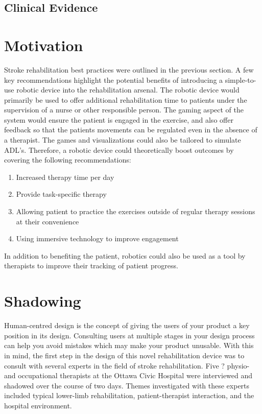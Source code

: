 \documentclass[12pt]{report}
\begin{document}
	\subsection{Clinical Evidence}
%
%

	\section{Motivation} 
Stroke rehabilitation best practices were outlined in the previous section. A few key recommendations highlight the potential benefits of introducing a simple-to-use robotic device into the rehabilitation arsenal. The robotic device would primarily be used to offer additional rehabilitation time to patients under the supervision of a nurse or other responsible person. The gaming aspect of the system would ensure the patient is engaged in the exercise, and also offer feedback so that the patients movements can be regulated even in the absence of a therapist. The games and visualizations could also be tailored to simulate ADL's. Therefore, a robotic device could theoretically boost outcomes by covering the following recommendations:
\begin{enumerate}
	\item Increased therapy time per day 
	\item Provide task-specific therapy
	\item Allowing patient to practice the exercises outside of regular therapy sessions at their convenience 
	\item Using immersive technology to improve engagement 
\end{enumerate}
In addition to benefiting the patient, robotics could also be used as a tool by therapists to improve their tracking of patient progress. 

	\section{Shadowing}
%
	
	
	Human-centred design is the concept of giving the users of your product a key position in its design. Consulting users at multiple stages in your design process can help you avoid mistakes which may make your product unusable. With this in mind, the first step in the design of this novel rehabilitation device was to consult with several experts in the field of stroke rehabilitation. Five ? physio- and occupational therapists at the Ottawa Civic Hospital were interviewed and shadowed over the course of two days. Themes investigated with these experts included typical lower-limb rehabilitation, patient-therapist interaction, and the hospital environment. 
	
\end{document}
